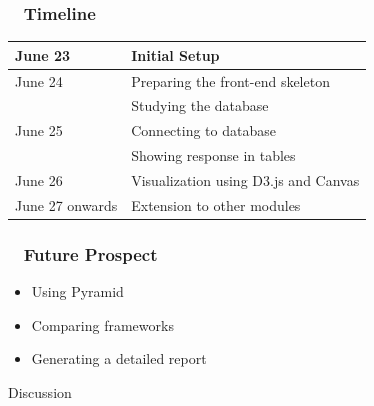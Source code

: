 \documentclass{beamer}
\begin{document}
\begin{frame}
\frametitle{~ Timeline}
\begin{center}

\begin{tabular}{|l|l|}
     \hline
     June 23 & Initial Setup\\
     \hline
     June 24 & Preparing the front-end skeleton\\
     \hline & Studying the database\\
     \hline
     June 25 & Connecting to database\\
     \hline & Showing response in tables\\
     \hline
     June 26 & Visualization using D3.js and Canvas\\
     \hline
     June 27 onwards & Extension to other modules\\
     \hline
     
\end{tabular}
\end{center}    
\end{frame}

\begin{frame}
\frametitle{ ~ Future Prospect} 
\begin{itemize}
\item{Using Pyramid}
\item{Comparing frameworks}
\item{Generating a detailed report}
\end{itemize}
\end{frame}



\begin{frame}
\begin{center}
\Huge{Discussion}
\end{center}
\end{frame}

\end{document}
